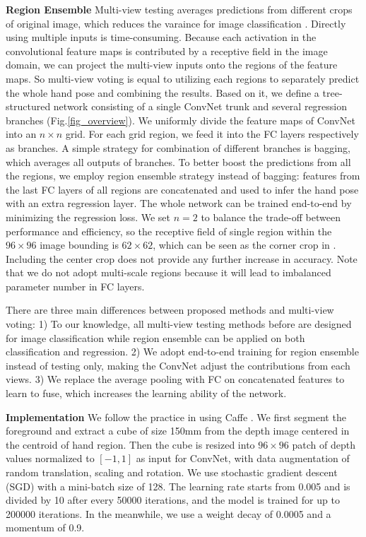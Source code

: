 \documentclass{article}
\begin{document}
\noindent\textbf{Region Ensemble}\hspace{2mm} Multi-view testing averages predictions from different crops of original image, which reduces the varaince for image classification \cite{krizhevsky2012imagenet}. Directly using multiple inputs is time-consuming. Because each activation in the convolutional feature maps is contributed by a receptive field in the image domain, we can project the multi-view inputs onto the regions of the feature maps. So multi-view voting is equal to utilizing each regions to separately predict the whole hand pose and combining the results. Based on it, we define a tree-structured network consisting of a single ConvNet trunk and several regression branches (Fig.\ref{fig_overview}). We uniformly divide the feature maps of ConvNet into an $n \times n$ grid. For each grid region, we feed it into the FC layers respectively as branches. A simple strategy for combination of different branches is bagging, which averages all outputs of branches. To better boost the predictions from all the regions, we employ region ensemble strategy instead of bagging: features from the last FC layers of all regions are concatenated and used to infer the hand pose with an extra regression layer. The whole network can be trained end-to-end by minimizing the regression loss. We set $n = 2$ to balance the trade-off between performance and efficiency, so the receptive field of single region within the $96\times96$ image bounding is $62\times62$, which can be seen as the corner crop in \cite{krizhevsky2012imagenet}. Including the center crop does not provide any further increase in accuracy. Note that we do not adopt multi-scale regions because it will lead to imbalanced parameter number in FC layers.

There are three main differences between proposed methods and multi-view voting: 1) To our knowledge, all multi-view testing methods before are designed for image classification while region ensemble can be applied on both classification and regression. 2) We adopt end-to-end training for region ensemble instead of testing only, making the ConvNet adjust the contributions from each views. 3) We replace the average pooling with FC on concatenated features to learn to fuse, which increases the learning ability of the network.

\noindent\textbf{Implementation}\hspace{2mm} We follow the practice in \cite{tompson2014real} \cite{oberweger2015hands} using Caffe \cite{jia2014caffe}. We first segment the foreground and extract a cube of size 150mm from the depth image centered in the centroid of hand region. Then the cube is resized into $96\times96$ patch of depth values normalized to $[-1, 1]$ as input for ConvNet, with data augmentation of random translation, scaling and rotation. We use stochastic gradient descent (SGD) with a mini-batch size of 128. The learning rate starts from 0.005 and is divided by 10 after every 50000 iterations, and the model is trained for up to 200000 iterations. In the meanwhile, we use a weight decay of 0.0005 and a momentum of 0.9.
\end{document}
